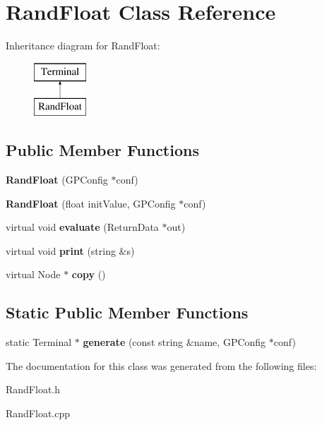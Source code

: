\hypertarget{class_rand_float}{\section{Rand\-Float Class Reference}
\label{class_rand_float}
}
Inheritance diagram for Rand\-Float\-:\begin{figure}[H]
\begin{center}
\leavevmode
\includegraphics[height=2.000000cm]{class_rand_float}
\end{center}
\end{figure}
\subsection*{Public Member Functions}
\begin{DoxyCompactItemize}
\item 
\hypertarget{class_rand_float_a5e94dcef866954df6b152fb8d2a5e5b7}{{\bfseries Rand\-Float} (G\-P\-Config $\ast$conf)}\label{class_rand_float_a5e94dcef866954df6b152fb8d2a5e5b7}

\item 
\hypertarget{class_rand_float_abb7becde66cc9884bfa23dc8b73b40be}{{\bfseries Rand\-Float} (float init\-Value, G\-P\-Config $\ast$conf)}\label{class_rand_float_abb7becde66cc9884bfa23dc8b73b40be}

\item 
\hypertarget{class_rand_float_a6207a53aae9ddde61b4df865a12a5761}{virtual void {\bfseries evaluate} (Return\-Data $\ast$out)}\label{class_rand_float_a6207a53aae9ddde61b4df865a12a5761}

\item 
\hypertarget{class_rand_float_a1080521794c25b5ab881dab1d829bb80}{virtual void {\bfseries print} (string \&s)}\label{class_rand_float_a1080521794c25b5ab881dab1d829bb80}

\item 
\hypertarget{class_rand_float_a1c86fd91edd14ffef050a9b610cfec17}{virtual Node $\ast$ {\bfseries copy} ()}\label{class_rand_float_a1c86fd91edd14ffef050a9b610cfec17}

\end{DoxyCompactItemize}
\subsection*{Static Public Member Functions}
\begin{DoxyCompactItemize}
\item 
\hypertarget{class_rand_float_a8ab1360b98f5c6cdeec81de6910b9004}{static Terminal $\ast$ {\bfseries generate} (const string \&name, G\-P\-Config $\ast$conf)}\label{class_rand_float_a8ab1360b98f5c6cdeec81de6910b9004}

\end{DoxyCompactItemize}


The documentation for this class was generated from the following files\-:\begin{DoxyCompactItemize}
\item 
Rand\-Float.\-h\item 
Rand\-Float.\-cpp\end{DoxyCompactItemize}
